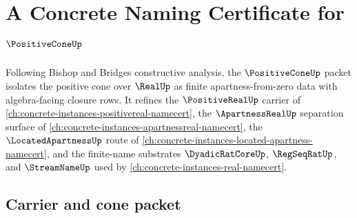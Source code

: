 \chapter{A Concrete Naming Certificate for $\PositiveConeUp$}
\label{ch:concrete-instances-positive-cone-namecert}

Following Bishop and Bridges constructive analysis, the $\PositiveConeUp$
packet isolates the positive cone over $\RealUp$ as finite
apartness-from-zero data with algebra-facing closure rows. It refines the
$\PositiveRealUp$ carrier of
\autoref{ch:concrete-instances-positivereal-namecert}, the
$\ApartnessRealUp$ separation surface of
\autoref{ch:concrete-instances-apartnessreal-namecert}, the
$\LocatedApartnessUp$ route of
\autoref{ch:concrete-instances-located-apartness-namecert}, and the
finite-name substrates $\DyadicRatCoreUp$, $\RegSeqRatUp$, and
$\StreamNameUp$ used by \autoref{ch:concrete-instances-real-namecert}.

\section{Carrier and cone packet}
\label{sec:positive-cone-carrier}

